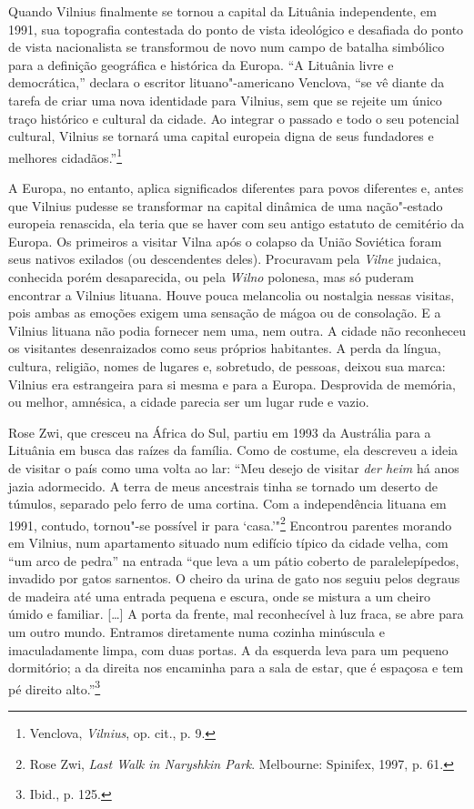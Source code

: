 Quando Vilnius finalmente se tornou a capital da Lituânia independente,
em 1991, sua topografia contestada do ponto de vista ideológico e desafiada do ponto de vista nacionalista se transformou de novo num campo de batalha simbólico para a
definição geográfica e histórica da Europa. ``A Lituânia livre e
democrática,'' declara o escritor lituano"-americano Venclova, ``se vê
diante da tarefa de criar uma nova identidade para Vilnius, sem que se
rejeite um único traço histórico e cultural da cidade. Ao integrar o
passado e todo o seu potencial cultural, Vilnius se tornará uma capital
europeia digna de seus fundadores e melhores cidadãos.''\footnote{Venclova, \textit{Vilnius}, op. cit., p. 9.}
\asterisc

A Europa, no entanto, aplica significados diferentes para povos
diferentes e, antes que Vilnius pudesse se transformar na capital
dinâmica de uma nação"-estado europeia renascida, ela teria que se haver
com seu antigo estatuto de cemitério da Europa. Os primeiros a visitar
Vilna após o colapso da União Soviética foram seus nativos exilados (ou
descendentes deles). Procuravam pela \textit{Vilne} judaica, conhecida porém
desaparecida, ou pela \textit{Wilno} polonesa, mas só puderam encontrar a Vilnius
lituana. Houve pouca melancolia ou nostalgia nessas visitas, pois ambas
as emoções exigem uma sensação de mágoa ou de consolação. E a Vilnius
lituana não podia fornecer nem uma, nem outra. A cidade não reconheceu
os visitantes desenraizados como seus próprios habitantes. A perda da
língua, cultura, religião, nomes de lugares e, sobretudo, de pessoas,
deixou sua marca: Vilnius era estrangeira para si mesma e para a Europa.
Desprovida de memória, ou melhor, amnésica, a cidade parecia ser um
lugar rude e vazio.

Rose Zwi, que cresceu na África do Sul, partiu em 1993 da Austrália para
a Lituânia em busca das raízes da família. Como de costume, ela
descreveu a ideia de visitar o país como uma volta ao lar: ``Meu desejo
de visitar \textit{der heim} há anos jazia adormecido. A terra de meus
ancestrais tinha se tornado um deserto de túmulos, separado pelo ferro
de uma cortina. Com a independência lituana em 1991, contudo, tornou"-se
possível ir para `casa.'"\footnote{Rose Zwi, \textit{Last Walk in Naryshkin Park}. Melbourne: Spinifex, 1997, p. 61.} Encontrou parentes morando em Vilnius, num apartamento situado num edifício típico
da cidade velha, com ``um arco de pedra'' na entrada ``que leva a um
pátio coberto de paralelepípedos, invadido por gatos sarnentos. O cheiro
da urina de gato nos seguiu pelos degraus de madeira até uma entrada
pequena e escura, onde se mistura a um cheiro úmido e familiar. [\ldots{}]
A porta da frente, mal reconhecível à luz fraca, se abre para um outro
mundo. Entramos diretamente numa cozinha minúscula e imaculadamente
limpa, com duas portas. A da esquerda leva para um pequeno dormitório; a
da direita nos encaminha para a sala de estar, que é espaçosa e tem pé
direito alto.''\footnote{Ibid., p. 125.}

